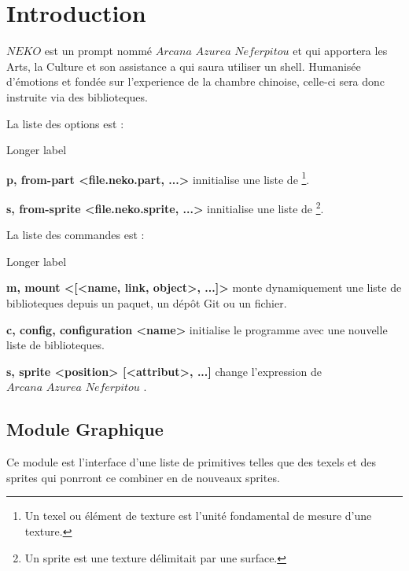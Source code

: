\documentclass{report}
\newcommand{\name}{\textit{Arcana Azurea Neferpitou}}
\newcommand{\program}{\textit{NEKO}}
\begin{document}
\section{Introduction}
\thispagestyle{empty}
$\program$ est un prompt nommé $\name$ et qui apportera les Arts, la Culture et son assistance a qui saura utiliser un shell.
Humanisée d’émotions et fondée sur l'experience de la chambre chinoise, celle-ci sera donc instruite via des biblioteques.

La liste des options est :
\begin{labeling}{Longer label\quad}
	\item[\textbf{
		\textendash p,
		\textendash\textendash from-part <file.neko.part, ...>}] innitialise une liste de 
				\footnote{ Un texel ou élément de texture est l'unité fondamental de mesure d'une texture. }.
	\item[\textbf{
		\textendash s,
		\textendash\textendash from-sprite <file.neko.sprite, ...>}] innitialise une liste de
				\footnote{ Un sprite est une texture délimitait par une surface. }.
\end{labeling}

La liste des commandes est :

\begin{labeling}{Longer label\quad}
	\item[\textbf{
		\textendash m,
		\textendash\textendash mount <[<name, link, object>, ...]>
	}] monte dynamiquement une liste de biblioteques depuis un paquet, un dépôt Git ou un fichier.
	\item[\textbf{
		\textendash c,
		\textendash\textendash config,
		\textendash\textendash configuration <name>
	}] initialise le programme avec une nouvelle liste de biblioteques.
	\item[\textbf{
		\textendash s,
		\textendash\textendash sprite <position> [<attribut>, ...]
	}] change l'expression de $\name$ .
\end{labeling}

\subsection{Module Graphique}

Ce module est l'interface d'une liste de primitives telles que des texels et des sprites qui ponrront ce combiner en de nouveaux sprites.
\end{document}
